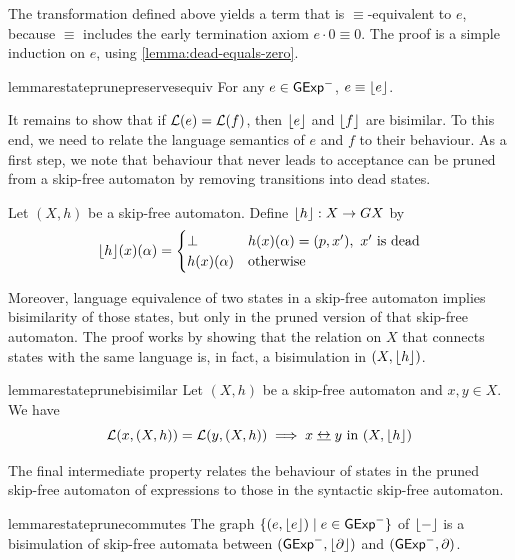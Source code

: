 \documentclass[orivec,envcountsect,envcountsame]{llncs}
\begin{document}
The transformation defined above yields a term that is \(\equiv\)-equivalent to $e$, because $\equiv$ includes the early termination axiom $e \cdot 0 \equiv 0$.
The proof is a simple induction on $e$, using \cref{lemma:dead-equals-zero}. %

\begin{restatable}{lemma}{restateprunepreservesequiv}%
\label{lem:prune-preserves-equiv}
    For any $e \in \mathsf{GExp}^-$, $e \equiv \lfloor e\rfloor$.
\end{restatable}

It remains to show that if $\mathcal{L}(e) = \mathcal{L}(f)$, then $\lfloor e\rfloor$ and $\lfloor f\rfloor$ are bisimilar.
To this end, we need to relate the language semantics of $e$ and $f$ to their behaviour.
As a first step, we note that behaviour that never leads to acceptance can be pruned from a skip-free automaton by removing transitions into dead states.

\begin{definition}
    Let $(X, h)$ be a skip-free automaton.
    Define $\lfloor h\rfloor: X \to GX$ by
    \[
        \lfloor h\rfloor(x)(\alpha) =
            \begin{cases}
            \bot & h(x)(\alpha) = (p, x'),\ \text{$x'$ is dead} \\
            h(x)(\alpha) & \text{otherwise}
            \end{cases}
    \]
\end{definition}

Moreover, language equivalence of two states in a skip-free automaton implies bisimilarity of those states, but only in the pruned version of that skip-free automaton.
The proof works by showing that the relation on $X$ that connects states with the same language is, in fact, a bisimulation in $(X, \lfloor h\rfloor)$.

\begin{restatable}{lemma}{restateprunebisimilar}%
\label{lemma:prune-bisimilar}
    Let $(X, h)$ be a skip-free automaton and $x,y \in X$.
    We have
    \[
        \L(x, (X, h)) = \L(y, (X, h))
        \implies
        x \bisim y ~\text{in}~(X, \floor{h})
    \]
\end{restatable}

The final intermediate property relates the behaviour of states in the pruned skip-free automaton of expressions to those in the syntactic skip-free automaton.

\begin{restatable}{lemma}{restateprunecommutes}%
\label{lemma:prune-commutes}
    The graph \(\{(e, \lfloor e\rfloor) \mid e \in \mathsf{GExp}^-\}\) of \(\lfloor-\rfloor\) is a bisimulation of skip-free automata between $(\mathsf{GExp}^-, \lfloor\partial\rfloor)$ and $(\mathsf{GExp}^-, \partial)$.
\end{restatable}
\end{document}
